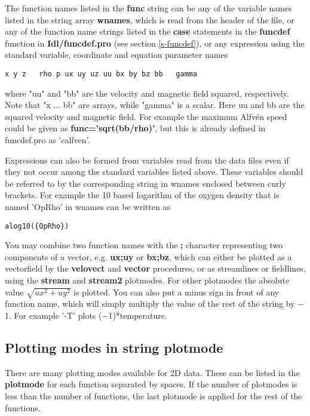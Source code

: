    The function names listed in the {\bf func} string can be any of 
   the variable names listed in the string array {\bf wnames}, which is 
   read from the header of the file, or any of the function name strings 
   listed in the {\bf case} statements in the {\bf funcdef} 
   function in {\bf Idl/funcdef.pro} (see section \ref{s-funcdef}), 
   or any expression using the standard variable, 
   coordinate and equation parameter names 
\begin{verbatim}
x y z   rho p ux uy uz uu bx by bz bb   gamma
\end{verbatim}
   where "uu" and "bb" are the velocity and magnetic field squared, 
   respectively. Note that "x ... bb" are arrays, while  "gamma" is
   a scalar. Here uu and bb are the squared velocity and magnetic field.
   For example the maximum Alfv\'en 
   speed could be given as {\bf func='sqrt(bb/rho)'}, but this is already 
   defined in funcdef.pro as 'calfven'. 

   Expressions can also be formed from variables read from the data files
   even if they not occur among the standard variables listed above.
   These variables should be referred to by the corresponding string 
   in wnames enclosed between curly brackets.
   For example the 10 based logarithm of the oxygen density that is named 
   'OpRho' in wnames can be written as
\begin{verbatim}
alog10({OpRho})
\end{verbatim}
   You may combine two function names with the {\bf ;} character representing
   two components of a vector, 
   e.g. {\bf ux;uy} or {\bf bx;bz}, which can either be plotted as a 
   vectorfield by the {\bf velovect} and {\bf vector} procedures, 
   or as streamlines or fieldlines, using the 
   {\bf stream} and {\bf stream2} plotmodes.
   For other plotmodes the absolute value
   $\sqrt{ux^2+uy^2}$ is plotted.
   You can also put a minus sign in front of any function name, which
   will simply multiply the value of the rest of the string by $-$1. 
   For example '-T' plots ($-$1)*temperature.

\subsection{Plotting modes in string plotmode \label{s-plotmode}}

   There are many plotting modes available for 2D data. These can be
   listed in the {\bf plotmode} for each function separated by spaces.
   If the number of plotmodes is less than the number of functions,
   the last plotmode is applied for the rest of the functions.

